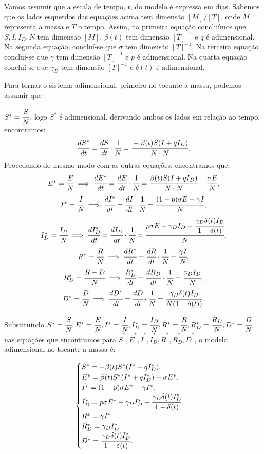 \documentclass[12pt]{article}
\begin{document}
Vamos assumir que a escala de tempo, $t$, do modelo é expressa em dias. Sabemos que os lados esquerdos das equações acima tem dimensão $[M]/[T]$, onde $M$ representa a massa e $T$ o tempo. Assim, na primeira equação concluímos que $S, I, I_D, N$ tem dimensão $[M]$, $\beta(t)$ tem dimensão $[T]^{-1}$ e $q$ é adimensional. Na segunda equação, concluí-se que $\sigma$ tem dimensão $[T]^{-1}$. Na terceira equação concluí-se que $\gamma$ tem dimensão $[T]^{-1}$ e $p$ é adimensional. Na quarta equação concluí-se que $\gamma_D$ tem dimensão $[T]^{-1}$ e $\delta(t)$ é adimensional. 

Para tornar o sistema adimensional, primeiro no tocante a massa, podemos assumir que 

$S^* = \cfrac{S}{N}$, logo $S^*$ é adimensional, derivando ambos os lados em relação ao tempo, encontramos:
$$\cfrac{dS^*}{dt} = \cfrac{dS}{dt} \cdot \cfrac{1}{N} = \cfrac{-\beta(t)S(I + qI_D)}{N \cdot N}.$$
Procedendo do mesmo modo com as outras equações, encontramos que:
$$E^* = \cfrac{E}{N} \implies \cfrac{dE^*}{dt} = \cfrac{dE}{dt} \cdot \cfrac{1}{N} = \cfrac{\beta(t)S(I + qI_D)}{N \cdot N} - \cfrac{\sigma E}{N},$$
$$I^* = \cfrac{I}{N} \implies \cfrac{dI^*}{dt} = \cfrac{dI}{dt} \cdot \cfrac{1}{N} = \cfrac{ (1-p)\sigma E - \gamma I}{N},$$
$$I_D^* = \cfrac{I_D}{N} \implies \cfrac{dI_D^*}{dt} = \cfrac{dI_D}{dt} \cdot \cfrac{1}{N} = \cfrac{ p\sigma E - \gamma_DI_D - \cfrac{\gamma_D\delta (t)I_D}{1 - \delta(t)}}{N},$$
$$R^* = \cfrac{R}{N} \implies \cfrac{dR^*}{dt} = \cfrac{dR}{dt} \cdot \cfrac{1}{N} = \cfrac{\gamma I}{N},$$
$$R_D^* = \cfrac{R-D}{N} \implies \cfrac{R_D^*}{dt} = \cfrac{dR_D}{dt} \cdot \cfrac{1}{N} = \cfrac{\gamma_DI_D}{N},$$
$$D^* = \cfrac{D}{N} \implies \cfrac{dD^*}{dt} = \cfrac{dD}{dt} \cdot \cfrac{1}{N} = \cfrac{\gamma_D \delta (t)I_D}{N(1 - \delta(t))}.$$



Substituindo $ S^* = \cfrac{S}{N}, E^* = \cfrac{E}{N}, I^* = \cfrac{I}{N},I_D^* = \cfrac{I_D}{N},R^* = \cfrac{R}{N},R_D^* = \cfrac{R_D}{N},D^* = \cfrac{D}{N} $ nas equações que encontramos para $\dot S^*,\dot E^*,\dot I^*,\dot I_D^*,\dot R^*, \dot R_D^*, \dot D^*$, o modelo adimensional no tocante a massa é:
\begin{center}
$$
\begin{cases}
\dot S^* = -\beta(t)S^*(I^* + qI_D^*). \\
\dot E^* = \beta(t)S^*(I^* + qI_D^*) - \sigma E^*. \\
\dot {I^*} = (1-p)\sigma E^* - \gamma I^*.\\
\dot {I_D^*} = p\sigma E^* - \gamma_DI_D^* - \cfrac{\gamma_D \delta (t)I_D^*}{1 - \delta(t)}.\\
\dot {R^*} = \gamma I^*.\\
\dot {R_D^*} = \gamma_DI_D^*.\\
\dot {D^*} = \cfrac{\gamma_D \delta (t)I_D^*}{1 - \delta(t)}.

\end{cases}
$$
\end{center}
\end{document}
